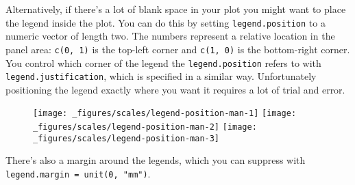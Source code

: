Alternatively, if there's a lot of blank space in your plot you might
want to place the legend inside the plot. You can do this by setting
\texttt{legend.position} to a numeric vector of length two. The numbers
represent a relative location in the panel area: \texttt{c(0,\ 1)} is
the top-left corner and \texttt{c(1,\ 0)} is the bottom-right corner.
You control which corner of the legend the \texttt{legend.position}
refers to with \texttt{legend.justification}, which is specified in a
similar way. Unfortunately positioning the legend exactly where you want
it requires a lot of trial and error.

\begin{Shaded}
\begin{Highlighting}[]
\StringTok{ }\StringTok{ }
\StringTok{  }\NormalTok{(}\NormalTok{(}  \NormalTok{)}

\StringTok{ }\NormalTok{(} \NormalTok{(}\NormalTok{, }\NormalTok{), } \NormalTok{(}\NormalTok{, }\NormalTok{))}
\StringTok{ }\NormalTok{(} \NormalTok{(}\NormalTok{, }\NormalTok{), } \NormalTok{(}\NormalTok{, }\NormalTok{))}
\StringTok{ }\NormalTok{(} \NormalTok{(}\NormalTok{, }\NormalTok{), } \NormalTok{(}\NormalTok{, }\NormalTok{))}
\end{Highlighting}
\end{Shaded}

\begin{figure}[H]
  \texttt{[image: \_figures/scales/legend-position-man-1]}%
  \texttt{[image: \_figures/scales/legend-position-man-2]}%
  \texttt{[image: \_figures/scales/legend-position-man-3]}
\end{figure}

There's also a margin around the legends, which you can suppress with
\texttt{legend.margin\ =\ unit(0,\ "mm")}.

